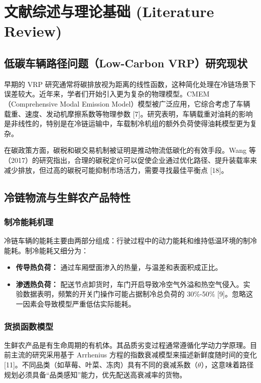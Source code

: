 \documentclass[11pt, a4paper]{article}
\begin{document}
\section{文献综述与理论基础 (Literature Review)}

\subsection{低碳车辆路径问题（Low-Carbon VRP）研究现状}
早期的 VRP 研究通常将碳排放视为距离的线性函数，这种简化处理在冷链场景下误差较大。近年来，学者们开始引入更为复杂的物理模型。CMEM（Comprehensive Modal Emission Model）模型被广泛应用，它综合考虑了车辆载重、速度、发动机摩擦系数等物理参数 [7]。研究表明，车辆载重对油耗的影响是非线性的，特别是在冷链运输中，车载制冷机组的额外负荷使得油耗模型更为复杂。

在碳政策方面，碳税和碳交易机制被证明是推动物流低碳化的有效手段。Wang 等（2017）的研究指出，合理的碳税定价可以促使企业通过优化路径、提升装载率来减少排放，但过高的碳税可能抑制市场活力，需要寻找最佳平衡点 [18]。

\subsection{冷链物流与生鲜农产品特性}

\subsubsection{制冷能耗机理}
冷链车辆的能耗主要由两部分组成：行驶过程中的动力能耗和维持低温环境的制冷能耗。制冷能耗又细分为：
\begin{itemize}
    \item \textbf{传导热负荷：} 通过车厢壁面渗入的热量，与温差和表面积成正比。
    \item \textbf{渗透热负荷：} 配送节点卸货时，车门开启导致冷空气外溢和热空气侵入。实验数据表明，频繁的开关门操作可能占据制冷总负荷的 30\%-50\% [9]。忽略这一因素会导致模型严重低估实际能耗。
\end{itemize}

\subsubsection{货损函数模型}
生鲜农产品是有生命周期的有机体。其品质劣变过程通常遵循化学动力学原理。目前主流的研究采用基于 Arrhenius 方程的指数衰减模型来描述新鲜度随时间的变化 [11]。不同品类（如草莓、叶菜、冻肉）具有不同的衰减系数（$\theta$），这意味着路径规划必须具备“品类感知”能力，优先配送高衰减率的货物。
\end{document}

